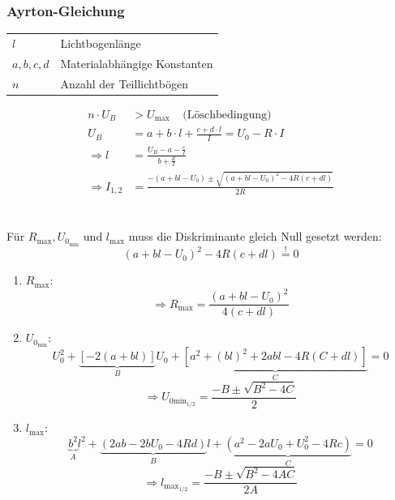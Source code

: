 \documentclass[a4paper,twocolumn,10pt]{article}
\newcommand{\sollsein}{\stackrel{!}{=}}
\begin{document}
\subsubsection{Ayrton-Gleichung}
\begin{tabular}{ll}
$l$ & Lichtbogenlänge\\
$a,b,c,d$ & Materialabhängige Konstanten\\
$n$ & Anzahl der Teillichtbögen
\end{tabular}
\begin{equation*}
\begin{split}
n\cdot U_B&>U_{\text{max}}\;\;\;\;\text{(Löschbedingung)}\\
U_B&=a+b\cdot l+\frac{c+d\cdot l}{I}=U_0-R\cdot I\\
\Rightarrow l&=\frac{U_B-a-\frac{c}{I}}{b+\frac{d}{I}}\\
\Rightarrow I_{1,2}&=\frac{-(a+bl-U_0)\pm\sqrt{(a+bl-U_0)^2-4R(c+dl)}}{2R}
\end{split}
\end{equation*}\\\\
Für $R_{\text{max}}, U_{0_{\text{min}}}$ und $l_{\text{max}}$ muss die Diskriminante gleich Null gesetzt werden:
\begin{equation*}
(a+bl-U_0)^2-4R(c+dl)\sollsein 0
\end{equation*}
\begin{enumerate}[label=$\bullet$]
\item $R_{\text{max}}$:
\begin{equation*}
\Rightarrow R_{\text{max}}=\frac{(a+bl-U_0)^2}{4(c+dl)}
\end{equation*}
\item $U_{0_{\text{min}}}$:
\begin{equation*}
U_0^2+\underbrace{[-2(a+bl)]}_{B}U_0+\underbrace{[a^2+(bl)^2+2abl-4R(C+dl)]}_{C}=0
\end{equation*}
\begin{equation*}
\Rightarrow U_{0\text{min}_{1/2}}=\frac{-B\pm\sqrt{B^2-4C}}{2}
\end{equation*}
\item $l_{\text{max}}$:
\begin{equation*}
\underbrace{b^2}_{A}l^2+\underbrace{(2ab-2bU_0-4Rd)}_{B}l+\underbrace{(a^2-2aU_0+U_0^2-4Rc)}_{C}=0
\end{equation*}
\begin{equation*}
\Rightarrow l_{\text{max}_{1/2}}=\frac{-B\pm\sqrt{B^2-4AC}}{2A}
\end{equation*}
\end{enumerate}
\end{document}
